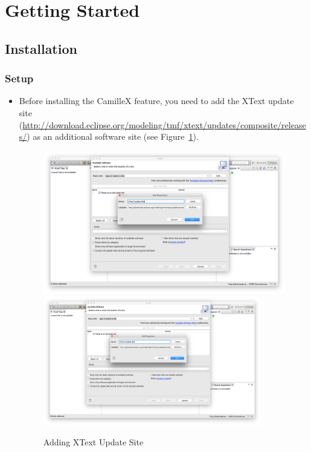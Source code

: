 \section{Getting Started}
\label{sec:getting-started}

\subsection{Installation}
\label{sec:installation}

\subsubsection{Setup}
\label{sec:setup}

\begin{itemize}
\item Before installing the CamilleX feature, you need to add the XText update site (\url{http://download.eclipse.org/modeling/tmf/xtext/updates/composite/releases/}) as an additional software site (see Figure~\ref{fig:xtext-updatesite}).
\begin{figure}[!htbp]
  \centering
  \ifplastex
  \includegraphics[width=512]{figures/XTextUpdateSite}
  \else
  \includegraphics[width=0.9\textwidth]{figures/XTextUpdateSite}
  \fi
  \caption{Adding XText Update Site}
  \label{fig:xtext-updatesite}
\end{figure}



\end{itemize}
